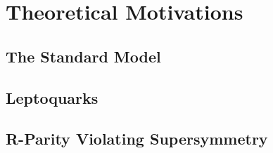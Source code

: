 \chapter{Theoretical Motivations
\label{ch:theory}}

\setcounter{section}{-1}

\section{The Standard Model}

\section{Leptoquarks}

\section{R-Parity Violating Supersymmetry}